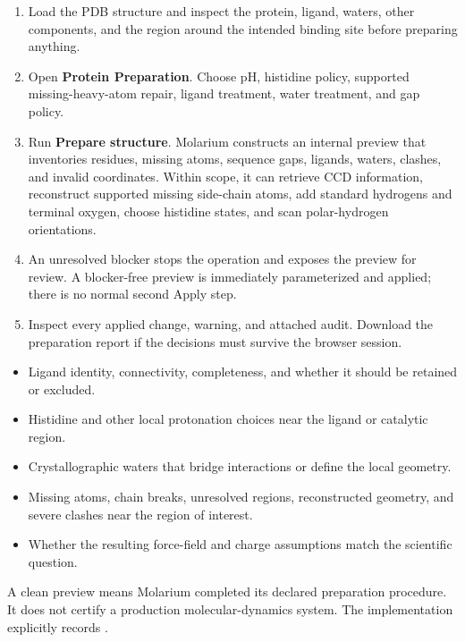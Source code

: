 \documentclass[11pt]{article}
\begin{document}
\begin{enumerate}
\item Load the PDB structure and inspect the protein, ligand, waters, other components, and the region around the intended binding site before preparing anything.
\item Open \textbf{Protein Preparation}. Choose pH, histidine policy, supported missing-heavy-atom repair, ligand treatment, water treatment, and gap policy.
\item Run \textbf{Prepare structure}. Molarium constructs an internal preview that inventories residues, missing atoms, sequence gaps, ligands, waters, clashes, and invalid coordinates. Within scope, it can retrieve CCD information, reconstruct supported missing side-chain atoms, add standard hydrogens and terminal oxygen, choose histidine states, and scan polar-hydrogen orientations.
\item An unresolved blocker stops the operation and exposes the preview for review. A blocker-free preview is immediately parameterized and applied; there is no normal second Apply step.
\item Inspect every applied change, warning, and attached audit. Download the preparation report if the decisions must survive the browser session.
\end{enumerate}


\begin{itemize}
\item Ligand identity, connectivity, completeness, and whether it should be retained or excluded.
\item Histidine and other local protonation choices near the ligand or catalytic region.
\item Crystallographic waters that bridge interactions or define the local geometry.
\item Missing atoms, chain breaks, unresolved regions, reconstructed geometry, and severe clashes near the region of interest.
\item Whether the resulting force-field and charge assumptions match the scientific question.
\end{itemize}

A clean preview means Molarium completed its declared preparation procedure. It does not certify a production molecular-dynamics system. The implementation explicitly records .
\end{document}
